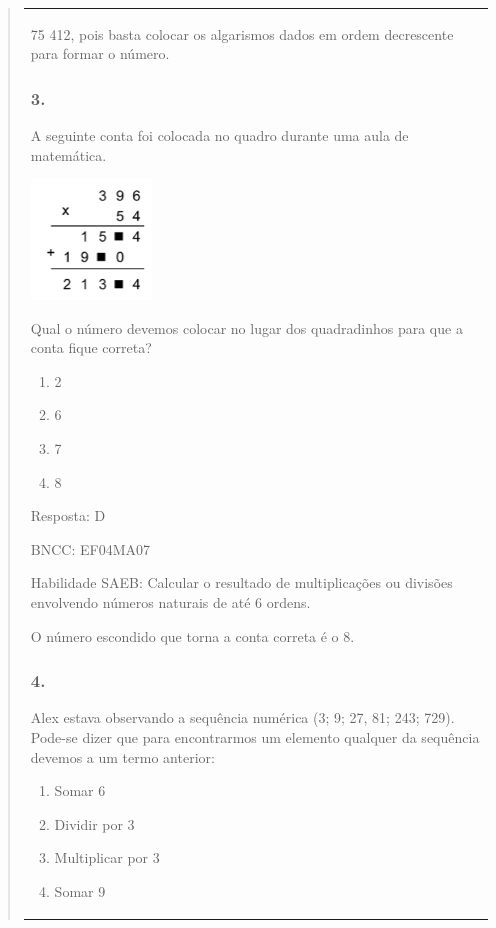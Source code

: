 \begin{enumerate}
\begin{escolha}
\begin{enumerate}
\begin{itemize}
\begin{itemize}
\begin{escolha}
\begin{quote}
\begin{escolha}
{\begin{longtable}[]{@{}l@{}}
\begin{itemize}
75 412, pois basta colocar os algarismos dados em ordem decrescente para
formar o número.

\subsubsection{3.}\label{section-174}

A seguinte conta foi colocada no quadro durante uma aula de matemática.

\includegraphics[width=1.26282in,height=1.25762in]{media/image159.png}

Qual o número devemos colocar no lugar dos quadradinhos para que a conta
fique correta?

\begin{enumerate}
\def\labelenumi{\alph{enumi})}
\item
  2
\item
  6
\item
  7
\item
  8
\end{enumerate}

Resposta: D

BNCC: EF04MA07

Habilidade SAEB: Calcular o resultado de multiplicações ou divisões
envolvendo números naturais de até 6 ordens.

O número escondido que torna a conta correta é o 8.

\subsubsection{4.}\label{section-175}

Alex estava observando a sequência numérica (3; 9; 27, 81; 243; 729).
Pode-se dizer que para encontrarmos um elemento qualquer da sequência
devemos a um termo anterior:

\begin{enumerate}
\def\labelenumi{\alph{enumi})}
\item
  Somar 6
\item
  Dividir por 3
\item
  Multiplicar por 3
\item
  Somar 9
\end{enumerate}


\end{itemize}
\end{longtable}}
\end{escolha}
\end{quote}
\end{escolha}
\end{itemize}
\end{itemize}
\end{enumerate}
\end{escolha}
\end{enumerate}

